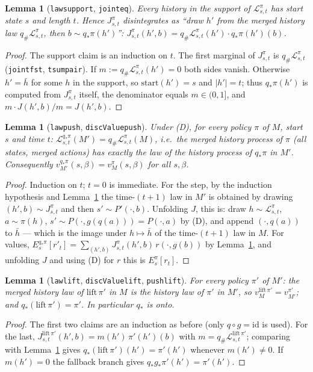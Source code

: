 \documentclass[11pt]{article}
\newtheorem{lemma}[theorem]{Lemma}
\theoremstyle{definition}
\theoremstyle{remark}
\renewcommand{\_}{\oldus\allowbreak}
\begin{document}
\begin{lemma}[\texttt{law\_support}, \texttt{joint\_eq}]\label{lem:dis}
Every history in the support of $\mathcal L^\pi_{s,t}$ has start state $s$ and length $t$. Hence
$J^\pi_{s,t}$ disintegrates as ``draw $h'$ from the merged history law
$q_\#\mathcal L^\pi_{s,t}$, then $b\sim q_*\pi(h')$'':
$J^\pi_{s,t}(h',b)=q_\#\mathcal L^\pi_{s,t}(h')\cdot q_*\pi(h')(b)$.
\end{lemma}
\begin{proof}
The support claim is an induction on $t$. The first marginal of $J^\pi_{s,t}$ is
$q_\#\mathcal L^\pi_{s,t}$ (\texttt{joint\_fst}, \texttt{tsum\_pair}). If
$m:=q_\#\mathcal L^\pi_{s,t}(h')=0$ both sides vanish. Otherwise $h'=\bar h$ for some $h$ in the
support, so $\mathrm{start}(h')=s$ and $|h'|=t$; thus $q_*\pi(h')$ is computed from
$J^\pi_{s,t}$ itself, the denominator equals $m\in(0,1]$, and $m\cdot J(h',b)/m=J(h',b)$.
\end{proof}

\begin{lemma}[\texttt{law\_push}, \texttt{discValue\_push}]\label{lem:push}
Under (D), for every policy $\pi$ of $M$, start $s$ and time $t$:
$\mathcal L^{q_*\pi}_{s,t}(M')=q_\#\mathcal L^\pi_{s,t}(M)$, i.e.\ the merged history process of
$\pi$ (all states, merged actions) has exactly the law of the history process of $q_*\pi$ in $M'$.
Consequently $v^{q_*\pi}_{M'}(s,\beta)=v^\pi_M(s,\beta)$ for all $s,\beta$.
\end{lemma}
\begin{proof}
Induction on $t$; $t=0$ is immediate. For the step, by the induction hypothesis and
Lemma~\ref{lem:dis} the time-$(t+1)$ law in $M'$ is obtained by drawing
$(h',b)\sim J^\pi_{s,t}$ and then $s'\sim P'(\cdot,b)$. Unfolding $J$, this is: draw
$h\sim\mathcal L^\pi_{s,t}$, $a\sim\pi(h)$, $s'\sim P(\cdot,g(q(a)))=P(\cdot,a)$ by (D), and append
$(\cdot,q(a))$ to $\bar h$ --- which is the image under $h\mapsto\bar h$ of the time-$(t+1)$ law in
$M$. For values, $E^{q_*\pi}_s[r'_t]=\sum_{(h',b)}J^\pi_{s,t}(h',b)\,r(\cdot,g(b))$ by
Lemma~\ref{lem:dis}, and unfolding $J$ and using (D) for $r$ this is $E^\pi_s[r_t]$.
\end{proof}

\begin{lemma}[\texttt{law\_lift}, \texttt{discValue\_lift}, \texttt{push\_lift}]\label{lem:lift}
For every policy $\pi'$ of $M'$: the merged history law of $\mathrm{lift}\,\pi'$ in $M$ is the
history law of $\pi'$ in $M'$, so $v^{\mathrm{lift}\,\pi'}_M=v^{\pi'}_{M'}$; and
$q_*(\mathrm{lift}\,\pi')=\pi'$. In particular $q_*$ is onto.
\end{lemma}
\begin{proof}
The first two claims are an induction as before (only $q\circ g=\mathrm{id}$ is used). For the
last, $J^{\mathrm{lift}\,\pi'}_{s,t}(h',b)=m(h')\,\pi'(h')(b)$ with
$m=q_\#\mathcal L^{\mathrm{lift}\,\pi'}_{s,t}$; comparing with Lemma~\ref{lem:dis} gives
$q_*(\mathrm{lift}\,\pi')(h')=\pi'(h')$ whenever $m(h')\neq0$. If $m(h')=0$ the fallback branch
gives $q_*g_*\pi'(h')=\pi'(h')$.
\end{proof}
\end{document}
